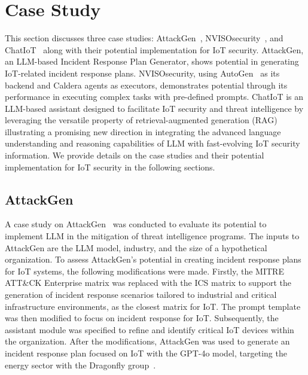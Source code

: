 \section{Case Study}
\label{sec6}
%
This section discusses three case studies: AttackGen~\citet{Adams_2024}, NVISOsecurity~\citet{Raman_2024}, and ChatIoT~\citet{dong2024chatiot} along with their potential implementation for IoT security.
AttackGen, an LLM-based Incident Response Plan Generator, shows potential in generating IoT-related incident response plans.
NVISOsecurity, using AutoGen~\citet{wu2023autogen} as its backend and Caldera agents as executors, demonstrates potential through its performance in executing complex tasks with pre-defined prompts.
ChatIoT is an LLM-based assistant designed to facilitate IoT security and threat intelligence by leveraging the versatile property of retrieval-augmented generation (RAG) illustrating a promising new direction in integrating the advanced language understanding and reasoning capabilities of LLM with fast-evolving IoT security information.
We provide details on the case studies and their potential implementation for IoT security in the following sections.
%
\subsection{AttackGen}
%
\begin{comment}
\begin{figure}[h!]
    \centering
    \texttt{[image: images/AttackGen.png]}
    \caption{a) Default implementation of AttackGen b) Modified Prompt case study on AttackGen}
    \label{fig:attackGen}
\end{figure}
\end{comment}
%
A case study on AttackGen~\citet{Adams_2024} was conducted to evaluate its potential to implement LLM in the mitigation of threat intelligence programs.
The inputs to AttackGen are the LLM model, industry, and the size of a hypothetical organization.
To assess AttackGen’s potential in creating incident response plans for IoT systems, the following modifications were made.
Firstly, the MITRE ATT\&CK Enterprise matrix was replaced with the ICS matrix to support the generation of incident response scenarios tailored to industrial and critical infrastructure environments, as the closest matrix for IoT.
The prompt template was then modified to focus on incident response for IoT.
Subsequently, the assistant module was specified to refine and identify critical IoT devices within the organization. 
After the modifications, AttackGen was used to generate an incident response plan focused on IoT with the GPT-4o model, targeting the energy sector with the Dragonfly group~\citet{Dragonfly}.


